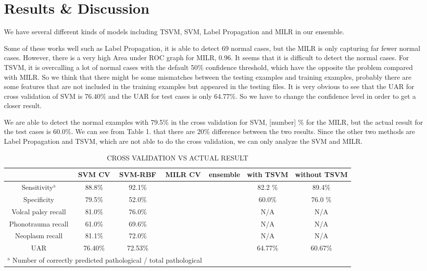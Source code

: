 \section{Results \& Discussion}


We have several different kinds of models including TSVM, SVM, Label Propagation and MILR in our ensemble. 

Some of these works well such as Label Propagation, it is able to detect 69 normal cases, but the MILR is only capturing far fewer normal cases. However, there is a very high Area under ROC graph for MILR, 0.96. It seems that it is difficult to detect the normal cases. For TSVM, it is overcalling a lot of normal cases with the default 50\% confidence threshold, which have the opposite the problem compared with MILR. So we think that there might be some mismatches between the testing examples and training examples, probably there are some features that are not included in the training examples but appeared in the testing files. It is very obvious to see that the UAR for cross validation of SVM is 76.40\% and the UAR for test cases is only 64.77\%. So we have to change the confidence level in order to get a closer result.

We are able to detect the normal examples with 79.5\% in the cross validation for SVM, [number] \% for the MILR, but the actual result for the test cases is 60.0\%. We can see from Table 1. that there are 20\% difference between the two results. Since the other two methods are Label Propagation and TSVM, which are not able to do the cross validation, we can only analyze the SVM and MILR.


\begin{table*}[!htbp]
	\caption{CROSS VALIDATION VS ACTUAL RESULT}
	\begin{center}
		\begin{tabular}{|c|c|c|c|c|c|c|}
			\hline
			 & SVM CV & SVM-RBF & MILR CV & ensemble & with TSVM & without TSVM \\
			\hline
			Sensitivity$^{\mathrm{a}}$  & 88.8\%& 92.1\% && & 82.2 \% & 89.4\% \\
			\hline
			Specificity & 79.5\% & 52.0\%&&& 60.0\% & 76.0 \% \\
			\hline
			Volcal palsy recall & 81.0\% &76.0\%& && N/A & N/A \\
			\hline
			Phonotrauma recall & 61.0\% &69.6\%&&& N/A& N/A\\
			\hline
			Neoplasm recall & 81.1\% & 72.0\%&&& N/A& N/A \\
			\hline
			UAR & 76.40\% &72.53\% && & 64.77\% & 60.67\%\\
			\hline
			\multicolumn{4}{l}{$^{\mathrm{a}}$ Number of correctly predicted pathological / total pathological}
		\end{tabular}
		\label{tab2}
	\end{center}
\end{table*}

